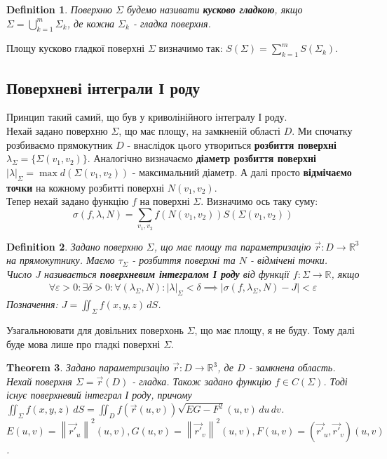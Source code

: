 \documentclass[a4paper, 10pt]{article}
\theoremstyle{theoremdd}
\newtheorem{theorem}{Theorem}[subsection]
\theoremstyle{theoremdd}
\newtheorem{definition}[theorem]{Definition}
\theoremstyle{theoremdd}
\theoremstyle{theoremdd}
\theoremstyle{theoremdd}
\theoremstyle{theoremdd}
\theoremstyle{theoremdd}
\theoremstyle{theoremdd}
\newcommand\Norm[1]{\left\lVert#1\right\rVert}
\begin{document}
\begin{definition}
Поверхню $\Sigma$ будемо називати \textbf{кусково гладкою}, якщо $\Sigma = \displaystyle\bigcup_{k=1}^m \Sigma_k$, де кожна $\Sigma_k$ - гладка поверхня.
\end{definition}

Площу кусково гладкої поверхні $\Sigma$ визначимо так: $S(\Sigma) = \displaystyle\sum_{k=1}^m S(\Sigma_k)$.

\subsection{Поверхневі інтеграли І роду}
Принцип такий самий, що був у криволінійного інтегралу І роду.\\
Нехай задано поверхню $\Sigma$, що має площу, на замкненій області $D$. Ми спочатку розбиваємо прямокутник $D$ - внаслідок цього утвориться \textbf{розбиття поверхні} $\lambda_\Sigma = \{ \Sigma(v_1,v_2) \}$. Аналогічно визначаємо \textbf{діаметр розбиття поверхні} $|\lambda|_\Sigma = \max d(\Sigma(v_1,v_2))$ - максимальний діаметр. А далі просто \textbf{відмічаємо точки} на кожному розбитті поверхні $N(v_1,v_2)$.\\
Тепер нехай задано функцію $f$ на поверхні $\Sigma$. Визначимо ось таку суму:
$$ \sigma(f,\lambda,N) = \displaystyle\sum_{v_1,v_2} f(N(v_1,v_2)) S(\Sigma(v_1,v_2))$$

\begin{definition}
Задано поверхню $\Sigma$, що має площу та параметризацію $\vec{r}: D \to \mathbb{R}^3$ на прямокутнику. Маємо $\tau_\Sigma$ - розбиття поверхні та $N$ - відмічені точки.\\
Число $J$ називається \textbf{поверхневим інтегралом І роду} від функції $f: \Sigma \to \mathbb{R}$, якщо
\begin{align*}
\forall \varepsilon > 0: \exists \delta > 0: \forall (\lambda_\Sigma, N): |\lambda|_\Sigma < \delta \implies |\sigma(f,\lambda_\Sigma,N) - J| < \varepsilon
\end{align*}
Позначення: $J = \displaystyle\iint_\Sigma f(x,y,z)\,dS$.
\end{definition}

Узагальноювати для довільних поверхонь $\Sigma$, що має площу, я не буду. Тому далі буде мова лише про гладкі поверхні $\Sigma$.

\begin{theorem}
Задано параметризацію $\vec{r}: D \to \mathbb{R}^3$, де $D$ - замкнена область. Нехай поверхня $\Sigma = \vec{r}(D)$ - гладка. Також задано функцію $f \in C(\Sigma)$. Тоді існує поверхневий інтеграл І роду, причому\\
$\displaystyle\iint_\Sigma f(x,y,z)\,dS = \iint_D f(\vec{r}(u,v)) \sqrt{EG -F^2}(u,v)\,du\,dv$.\\
$E(u,v) = \Norm{\vec{r'}_u}^2(u,v), G(u,v) = \Norm{\vec{r'}_v}^2(u,v), F(u,v) = (\vec{r'}_u, \vec{r'}_v)(u,v)$.
\end{theorem}
\end{document}
